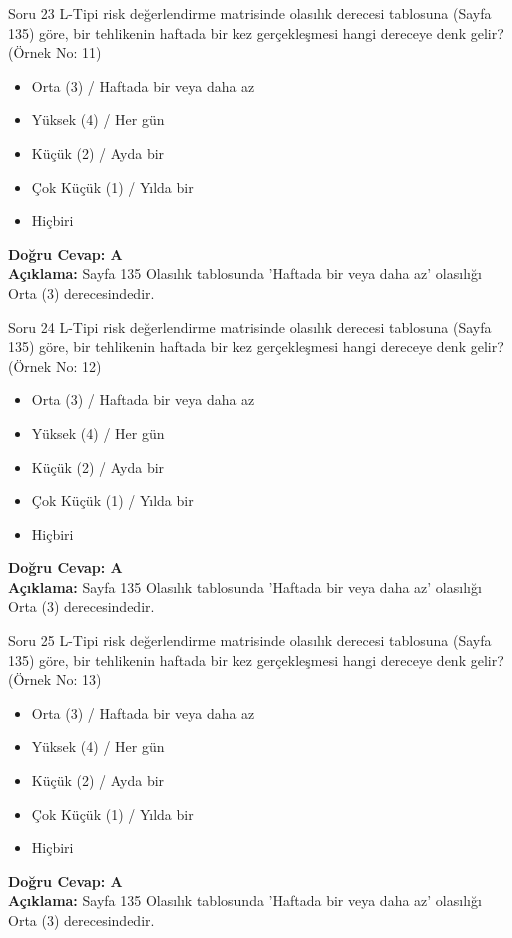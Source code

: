 \documentclass[12pt,a4paper]{article}
\begin{document}
\begin{testcard}{Soru 23}
    L-Tipi risk değerlendirme matrisinde olasılık derecesi tablosuna (Sayfa 135) göre, bir tehlikenin haftada bir kez gerçekleşmesi hangi dereceye denk gelir? (Örnek No: 11)
    \begin{itemize}
        \item[A)] Orta (3) / Haftada bir veya daha az
        \item[B)] Yüksek (4) / Her gün
        \item[C)] Küçük (2) / Ayda bir
        \item[D)] Çok Küçük (1) / Yılda bir
        \item[E)] Hiçbiri
    \end{itemize}
    \tcblower
    \textbf{Doğru Cevap: A} \\
    \textbf{Açıklama:} Sayfa 135 Olasılık tablosunda 'Haftada bir veya daha az' olasılığı Orta (3) derecesindedir.
\end{testcard}

\begin{testcard}{Soru 24}
    L-Tipi risk değerlendirme matrisinde olasılık derecesi tablosuna (Sayfa 135) göre, bir tehlikenin haftada bir kez gerçekleşmesi hangi dereceye denk gelir? (Örnek No: 12)
    \begin{itemize}
        \item[A)] Orta (3) / Haftada bir veya daha az
        \item[B)] Yüksek (4) / Her gün
        \item[C)] Küçük (2) / Ayda bir
        \item[D)] Çok Küçük (1) / Yılda bir
        \item[E)] Hiçbiri
    \end{itemize}
    \tcblower
    \textbf{Doğru Cevap: A} \\
    \textbf{Açıklama:} Sayfa 135 Olasılık tablosunda 'Haftada bir veya daha az' olasılığı Orta (3) derecesindedir.
\end{testcard}

\begin{testcard}{Soru 25}
    L-Tipi risk değerlendirme matrisinde olasılık derecesi tablosuna (Sayfa 135) göre, bir tehlikenin haftada bir kez gerçekleşmesi hangi dereceye denk gelir? (Örnek No: 13)
    \begin{itemize}
        \item[A)] Orta (3) / Haftada bir veya daha az
        \item[B)] Yüksek (4) / Her gün
        \item[C)] Küçük (2) / Ayda bir
        \item[D)] Çok Küçük (1) / Yılda bir
        \item[E)] Hiçbiri
    \end{itemize}
    \tcblower
    \textbf{Doğru Cevap: A} \\
    \textbf{Açıklama:} Sayfa 135 Olasılık tablosunda 'Haftada bir veya daha az' olasılığı Orta (3) derecesindedir.
\end{testcard}
\end{document}
